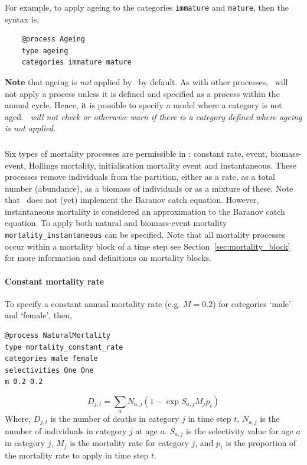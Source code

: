 For example, to apply ageing to the categories \texttt{immature} and \texttt{mature}, then the syntax is,

{\small{\begin{verbatim}
	@process Ageing
	type ageing
	categories immature mature
	\end{verbatim}}}

\textbf{Note} that ageing is \emph{not} applied by \CNAME\ by default. As with other processes, \CNAME\ will not apply a process unless it is defined and specified as a process within the annual cycle. Hence, it is possible to specify a model where a category is not aged. \emph{\CNAME\ will not check or otherwise warn if there is a category defined where ageing is not applied.}

\subsubsection{\label{sec:mortality}}

Six types of mortality processes are permissible in \CNAME: constant rate, event, biomass-event, Hollings mortality, initialisation mortality event and instantaneous. These processes remove individuals from the partition, either as a rate, as a total number (abundance), as a biomass of individuals or as a mixture of these. Note that \CNAME\ does not (yet) implement the Baranov catch equation. However, instantaneous mortality is considered an approximation to the Baranov catch equation. To apply both natural and biomass-event mortality \texttt{mortality\_instantaneous} can be specified. Note that all mortality processes occur within a mortality block of a time step see Section~\ref{sec:mortality_block} for more information and definitions on mortality blocks. 

\paragraph{Constant mortality rate}
To specify a constant annual mortality rate (e.g. $M=0.2$) for categories `male' and `female', then, 
{\small{\begin{verbatim}
@process NaturalMortality
type mortality_constant_rate
categories male female
selectivities One One
m 0.2 0.2

\end{verbatim}}}

\begin{equation}
D_{j,t} = \sum_a N_{a,j} (1 - \exp{S_{a,j} M_j p_t})
\end{equation}
Where, $D_{j,t}$ is the number of deaths in category $j$ in time step $t$, $N_{a,j}$ is the number of individuals in category $j$ at age $a$. $S_{a,j}$ is the selectivity value for age $a$ in category $j$, $M_j$ is the mortality rate for category $j$, and $p_t$ is the proportion of the mortality rate to apply in time step $t$.

